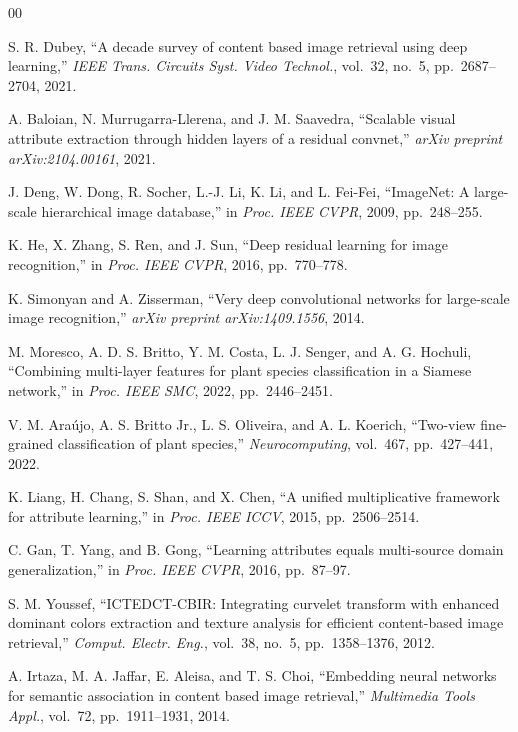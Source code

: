 \documentclass[letterpaper, 10 pt, conference]{ieeeconf}
\begin{document}
\begin{thebibliography}{00}

S. R. Dubey, ``A decade survey of content based image retrieval using deep
learning,'' \emph{IEEE Trans. Circuits Syst. Video Technol.}, vol.~32,
no.~5, pp.~2687--2704, 2021.

A. Baloian, N. Murrugarra-Llerena, and J. M. Saavedra, ``Scalable visual
attribute extraction through hidden layers of a residual convnet,''
\emph{arXiv preprint arXiv:2104.00161}, 2021.

J. Deng, W. Dong, R. Socher, L.-J. Li, K. Li, and L. Fei-Fei,
``ImageNet: A large-scale hierarchical image database,'' in
\emph{Proc. IEEE CVPR}, 2009, pp.~248--255.

K. He, X. Zhang, S. Ren, and J. Sun, ``Deep residual learning for image
recognition,'' in \emph{Proc. IEEE CVPR}, 2016, pp.~770--778.

K. Simonyan and A. Zisserman, ``Very deep convolutional networks for
large-scale image recognition,'' \emph{arXiv preprint arXiv:1409.1556},
2014.

M. Moresco, A. D. S. Britto, Y. M. Costa, L. J. Senger, and
A. G. Hochuli, ``Combining multi-layer features for plant species
classification in a Siamese network,'' in \emph{Proc. IEEE SMC}, 2022,
pp.~2446--2451.

V. M. Ara\'{u}jo, A. S. Britto Jr., L. S. Oliveira, and A. L. Koerich,
``Two-view fine-grained classification of plant species,''
\emph{Neurocomputing}, vol.~467, pp.~427--441, 2022.

K. Liang, H. Chang, S. Shan, and X. Chen, ``A unified multiplicative
framework for attribute learning,'' in \emph{Proc. IEEE ICCV}, 2015,
pp.~2506--2514.

C. Gan, T. Yang, and B. Gong, ``Learning attributes equals multi-source
domain generalization,'' in \emph{Proc. IEEE CVPR}, 2016, pp.~87--97.

S. M. Youssef, ``ICTEDCT-CBIR: Integrating curvelet transform with
enhanced dominant colors extraction and texture analysis for efficient
content-based image retrieval,'' \emph{Comput. Electr. Eng.}, vol.~38,
no.~5, pp.~1358--1376, 2012.

A. Irtaza, M. A. Jaffar, E. Aleisa, and T. S. Choi, ``Embedding neural
networks for semantic association in content based image retrieval,''
\emph{Multimedia Tools Appl.}, vol.~72, pp.~1911--1931, 2014.


\end{thebibliography}
\end{document}
